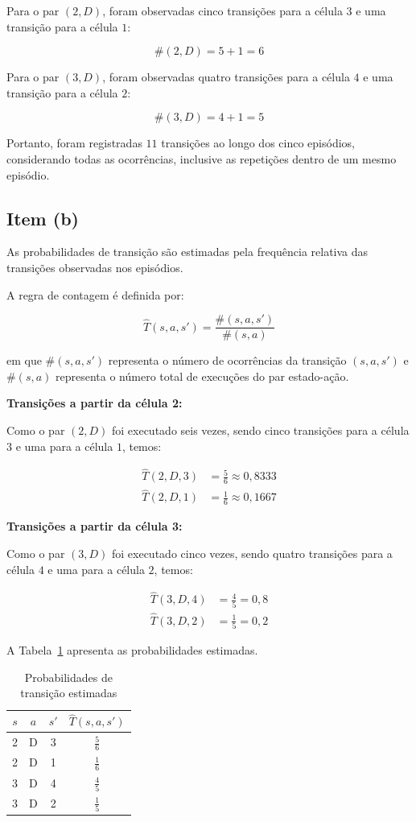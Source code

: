 Para o par $(2,D)$, foram observadas
cinco transições para a célula $3$
e uma transição para a célula $1$:

\[
    \#(2,D)=5+1=6
\]

Para o par $(3,D)$, foram observadas
quatro transições para a célula $4$
e uma transição para a célula $2$:

\[
    \#(3,D)=4+1=5
\]

Portanto, foram registradas $11$
transições ao longo dos cinco episódios,
considerando todas as ocorrências,
inclusive as repetições dentro de um
mesmo episódio.


\subsection{Item (b)}

As probabilidades de transição são estimadas
pela frequência relativa das transições
observadas nos episódios.

A regra de contagem é definida por:

\[
    \hat{T}(s,a,s') =
    \frac{\#(s,a,s')}{\#(s,a)}
\]

em que $\#(s,a,s')$ representa o número
de ocorrências da transição $(s,a,s')$
e $\#(s,a)$ representa o número total
de execuções do par estado-ação.

\textbf{Transições a partir da célula 2:}

Como o par $(2,D)$ foi executado seis vezes,
sendo cinco transições para a célula $3$
e uma para a célula $1$, temos:

\[
\begin{aligned}
\hat{T}(2,D,3)
&=\frac{5}{6}\approx0{,}8333
\\[6pt]
\hat{T}(2,D,1)
&=\frac{1}{6}\approx0{,}1667
\end{aligned}
\]

\textbf{Transições a partir da célula 3:}

Como o par $(3,D)$ foi executado cinco vezes,
sendo quatro transições para a célula $4$
e uma para a célula $2$, temos:

\[
\begin{aligned}
\hat{T}(3,D,4)
&=\frac{4}{5}=0{,}8
\\[6pt]
\hat{T}(3,D,2)
&=\frac{1}{5}=0{,}2
\end{aligned}
\]

A Tabela~\ref{tab:probabilidades_estimadas}
apresenta as probabilidades estimadas.

\begin{table}[H]
    \centering
    \caption{Probabilidades de transição estimadas}
    \label{tab:probabilidades_estimadas}
    \begin{tabular}{cccc}
        \toprule
        $s$ & $a$ & $s'$ & $\hat{T}(s,a,s')$ \\
        \midrule
        2 & D & 3 & $\frac{5}{6}$ \\
        2 & D & 1 & $\frac{1}{6}$ \\
        3 & D & 4 & $\frac{4}{5}$ \\
        3 & D & 2 & $\frac{1}{5}$ \\
        \bottomrule
    \end{tabular}
\end{table}

